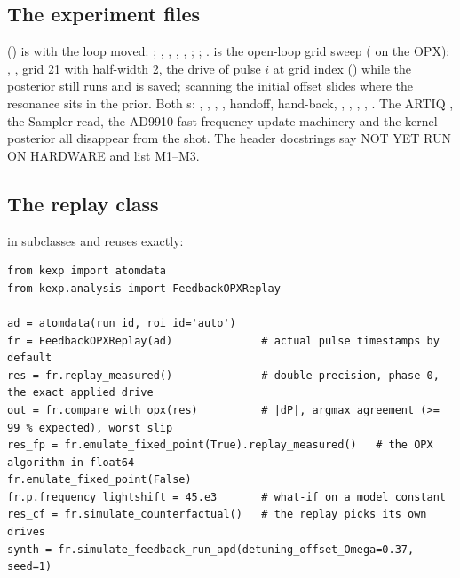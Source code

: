 \subsection{The experiment files}

 () is
 with the loop moved: ; ,
, ,
, ;
; .
 is the open-loop grid sweep
( on the OPX): , , grid 21 with half-width 2, the drive of pulse $i$
at grid index  ()
while the posterior still runs and is saved; scanning the initial offset
slides where the resonance sits in the prior. Both s:
, ,
,
, handoff, hand-back, ,
, , ,
. The ARTIQ , the Sampler read, the AD9910
fast-frequency-update machinery and the kernel posterior all disappear from
the shot. The header docstrings say NOT YET RUN ON HARDWARE and list M1--M3.

\subsection{The replay class}
\label{sec:feedback:replay}

in  subclasses  and
reuses  exactly:

\begin{lstlisting}[style=py]
from kexp import atomdata
from kexp.analysis import FeedbackOPXReplay

ad = atomdata(run_id, roi_id='auto')
fr = FeedbackOPXReplay(ad)              # actual pulse timestamps by default
res = fr.replay_measured()              # double precision, phase 0, the exact applied drive
out = fr.compare_with_opx(res)          # |dP|, argmax agreement (>= 99 % expected), worst slip
res_fp = fr.emulate_fixed_point(True).replay_measured()   # the OPX algorithm in float64
fr.emulate_fixed_point(False)
fr.p.frequency_lightshift = 45.e3       # what-if on a model constant
res_cf = fr.simulate_counterfactual()   # the replay picks its own drives
synth = fr.simulate_feedback_run_apd(detuning_offset_Omega=0.37, seed=1)
\end{lstlisting}

